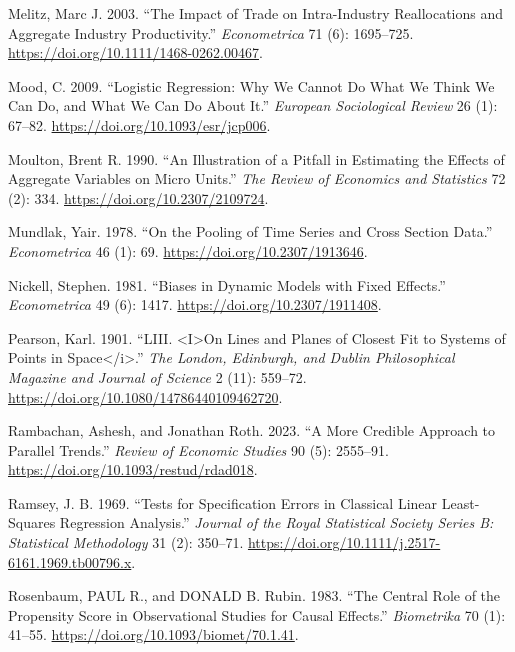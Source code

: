 \documentclass[
  letterpaper,
  10pt,
  twoside,
  openright,
  numbers=noenddot,
  chapterprefix=true]{scrbook}
\newlength{\cslhangindent}
\newenvironment{CSLReferences}[2] %
 {\begin{list}{}{%
  \setlength{\itemindent}{0pt}
  \setlength{\leftmargin}{0pt}
  \setlength{\parsep}{0pt}
  \ifodd #1
   \setlength{\leftmargin}{\cslhangindent}
   \setlength{\itemindent}{-1\cslhangindent}
  \fi
  \setlength{\itemsep}{#2\baselineskip}}}
 {\end{list}}
\begin{document}
\begin{CSLReferences}{1}{0}
Melitz, Marc J. 2003. {``{The} {Impact} of {Trade} on {Intra}-{Industry}
{Reallocations} and {Aggregate} {Industry} {Productivity}.''}
\emph{{Econometrica}} 71 (6): 1695--725.
\url{https://doi.org/10.1111/1468-0262.00467}.

Mood, C. 2009. {``{Logistic} {Regression}: {Why} {We} {Cannot} {Do}
{What} {We} {Think} {We} {Can} {Do}, and {What} {We} {Can} {Do} {About}
{It}.''} \emph{{European} {Sociological} {Review}} 26 (1): 67--82.
\url{https://doi.org/10.1093/esr/jcp006}.

Moulton, Brent R. 1990. {``{An} {Illustration} of a {Pitfall} in
{Estimating} the {Effects} of {Aggregate} {Variables} on {Micro}
{Units}.''} \emph{{The} {Review} of {Economics} and {Statistics}} 72
(2): 334. \url{https://doi.org/10.2307/2109724}.

Mundlak, Yair. 1978. {``{On} the {Pooling} of {Time} {Series} and
{Cross} {Section} {Data}.''} \emph{{Econometrica}} 46 (1): 69.
\url{https://doi.org/10.2307/1913646}.

Nickell, Stephen. 1981. {``{Biases} in {Dynamic} {Models} with {Fixed}
{Effects}.''} \emph{{Econometrica}} 49 (6): 1417.
\url{https://doi.org/10.2307/1911408}.

Pearson, Karl. 1901. {``{LIII}. \textless I\textgreater{}{On} Lines and
Planes of Closest Fit to Systems of Points in
Space\textless/i\textgreater{}.''} \emph{{The} {London}, {Edinburgh},
and {Dublin} {Philosophical} {Magazine} and {Journal} of {Science}} 2
(11): 559--72. \url{https://doi.org/10.1080/14786440109462720}.

Rambachan, Ashesh, and Jonathan Roth. 2023. {``A {More} {Credible}
{Approach} to {Parallel} {Trends}.''} \emph{{Review} of {Economic}
{Studies}} 90 (5): 2555--91.
\url{https://doi.org/10.1093/restud/rdad018}.

Ramsey, J. B. 1969. {``{Tests} for {Specification} {Errors} in
{Classical} {Linear} {Least}-{Squares} {Regression} {Analysis}.''}
\emph{{Journal} of the {Royal} {Statistical} {Society} {Series} B:
{Statistical} {Methodology}} 31 (2): 350--71.
\url{https://doi.org/10.1111/j.2517-6161.1969.tb00796.x}.

Rosenbaum, PAUL R., and DONALD B. Rubin. 1983. {``{The} Central Role of
the Propensity Score in Observational Studies for Causal Effects.''}
\emph{{Biometrika}} 70 (1): 41--55.
\url{https://doi.org/10.1093/biomet/70.1.41}.


\end{CSLReferences}
\end{document}
